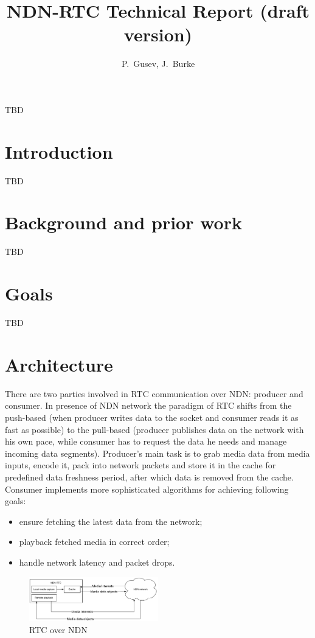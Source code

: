 \documentclass[10pt]{proc}
\author{P.~Gusev, J.~Burke}
\title{NDN-RTC Technical Report (draft version)}
\begin{document}
\maketitle

\abstract
TBD

\section{Introduction}
TBD

\section{Background and prior work}
TBD

\section{Goals}
TBD

\section{Architecture}
There are two parties involved in RTC communication over NDN: producer and consumer. In presence of NDN network the paradigm of RTC shifts from the push-based (when producer writes data to the socket and consumer reads it as fast as possible) to the pull-based (producer publishes data on the network with his own pace, while consumer has to request the data he needs and manage incoming data segments).
Producer's main task is to grab media data from media inputs, encode it, pack into network packets and store it in the cache for predefined data freshness period, after which data is removed from the cache.
Consumer implements more sophisticated algorithms for achieving following goals:
\begin{itemize}
\item ensure fetching the latest data from the network; 
\item playback fetched media in correct order;
\item handle network latency and packet drops.
\end{itemize}

\begin{figure}[Ht!]
\centering
\includegraphics[width=0.5\textwidth]{architecture}
\caption{RTC over NDN}
\label{fig:arc}
\end{figure}
\end{document}
